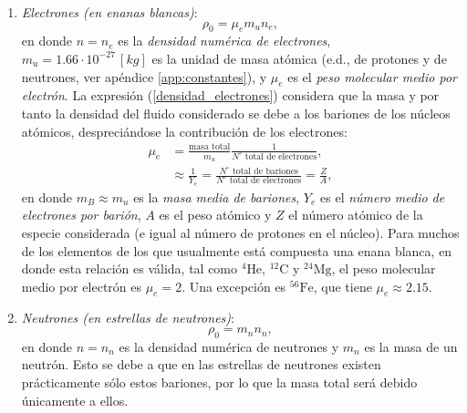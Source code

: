 \begin{enumerate}
 \item \emph{Electrones (en enanas blancas)}:
\begin{equation}\label{densidad_electrones}
\rho_0=\mu_e  m_u n_e,
\end{equation}
en donde $n=n_e$ es la \textit{densidad numérica de electrones}, $m_u=1.66\cdot10^{-27}\,[kg]$ es la unidad de masa atómica (e.d., de protones y de neutrones, ver apéndice \ref{app:constantes}), y $\mu_e$ es el \textit{peso molecular medio por electrón}. La expresión (\ref{densidad_electrones}) considera que la masa y por tanto la densidad del fluido considerado se debe a los bariones de los núcleos atómicos, despreciándose la contribución de los electrones:
\begin{align}
 \mu_e&=\frac{\text{masa total}}{m_u}\frac{1}{N^{\circ}\text{ total de electrones}},\\
&\approx \frac{1}{Y_e}=\frac{N^{\circ}\text{ total de bariones}}{N^{\circ}\text{ total de electrones}}=\frac{Z}{A},
\end{align}
en donde $m_B\approx m_u$ es la \textit{masa media de bariones}, $Y_e$ es el \textit{número medio de electrones por barión}, $A$ es el peso atómico y $Z$ el número atómico de la especie considerada (e igual al número de protones en el núcleo).  Para muchos de los elementos de los que usualmente está compuesta una enana blanca,  en donde esta relación es válida, tal como ${}^4\textrm{He}$, ${}^{12}\textrm{C}$ y ${}^{24}\textrm{Mg}$, el peso molecular medio por electrón es $\mu_e=2$. Una excepción es ${}^{56}\textrm{Fe}$, que tiene $\mu_e\approx2.15$.

\item \emph{Neutrones (en estrellas de neutrones)}:
\begin{equation}\label{densidad_neutrones}
\rho_0=  m_n n_n,
\end{equation}
en donde $n=n_n$ es la densidad numérica de neutrones y $m_n$ es la masa de un neutrón. Esto se debe a que en las estrellas de neutrones existen prácticamente sólo estos bariones, por lo que la masa total será debido únicamente a ellos.
\end{enumerate}

